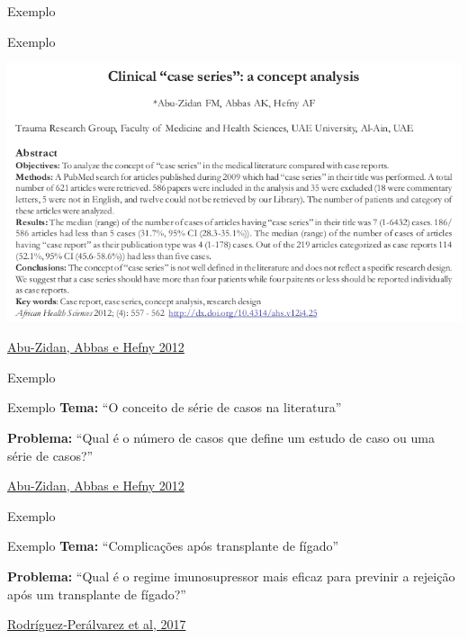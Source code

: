 \documentclass{beamer}
\begin{document}
\begin{frame}{Exemplo}
  \begin{exampleblock}{Exemplo}
    \begin{center}
      \includegraphics[width=.95\textwidth]{Metodos/case-series}
    \end{center}
  \end{exampleblock}

  \vfill
  \scriptsize
  \hfill \href{http://dx.doi.org/10.4314/ahs.v12i4.25}{Abu-Zidan, Abbas e Hefny 2012}
\end{frame}

\begin{frame}{Exemplo}
  \begin{exampleblock}{Exemplo}
    \small
    {\bf Tema:} ``O conceito de série de casos na literatura''

    \bigskip

    {\bf Problema:} ``Qual é o número de casos que define um estudo de caso ou uma série de casos?''
  \end{exampleblock}

  \vfill
  \scriptsize
  \hfill \href{http://dx.doi.org/10.4314/ahs.v12i4.25}{Abu-Zidan, Abbas e Hefny 2012}
\end{frame}

\begin{frame}{Exemplo}
  \begin{exampleblock}{Exemplo}
    \small
    {\bf Tema: }``Complicações após transplante de fígado''

    \bigskip

    {\bf Problema:} ``Qual é o regime imunosupressor mais eficaz para previnir a rejeição após um transplante de fígado?''
  \end{exampleblock}

  \vfill
  \scriptsize
  \hfill \href{https://doi.org/10.1002/14651858.cd011639.pub2}{Rodríguez‐Perálvarez et al, 2017}
\end{frame}
\end{document}
